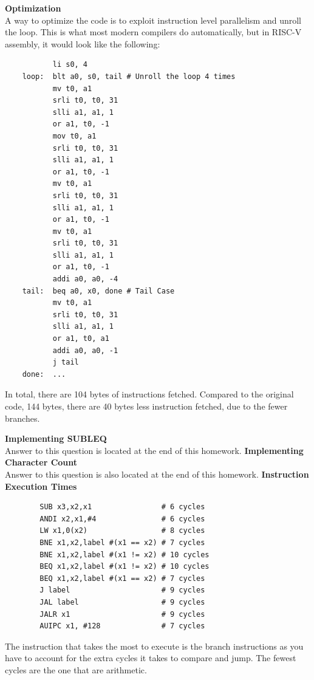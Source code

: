 \documentclass[11pt]{article}
\begin{document}
\begin{Parts}
	\Part \textbf{Optimization} \\
	A way to optimize the code is to exploit instruction level parallelism and unroll the loop. This is what most modern compilers do automatically, but in RISC-V assembly, it would look like the following: \\
	\begin{lstlisting}
           li s0, 4
    loop:  blt a0, s0, tail # Unroll the loop 4 times
    	   mv t0, a1
	       srli t0, t0, 31
	       slli a1, a1, 1
	       or a1, t0, -1
	       mov t0, a1
	       srli t0, t0, 31
	       slli a1, a1, 1
	       or a1, t0, -1
	       mv t0, a1
	       srli t0, t0, 31
	       slli a1, a1, 1
	       or a1, t0, -1
	       mv t0, a1
	       srli t0, t0, 31
	       slli a1, a1, 1
	       or a1, t0, -1
	       addi a0, a0, -4
    tail:  beq a0, x0, done # Tail Case
           mv t0, a1 
           srli t0, t0, 31
           slli a1, a1, 1
           or a1, t0, a1
           addi a0, a0, -1
           j tail
    done:  ...
    \end{lstlisting}
	In total, there are 104 bytes of instructions fetched. Compared to the original code, 144 bytes, there are 40 bytes less instruction fetched, due to the fewer branches.
\end{Parts}
\newpage

\begin{Parts}
	\Part \textbf{Implementing SUBLEQ} \\
	Answer to this question is located at the end of this homework.
	\Part \textbf{Implementing Character Count} \\
	Answer to this question is also located at the end of this homework.
	\Part \textbf{Instruction Execution Times} \\
	\begin{lstlisting}
    	SUB x3,x2,x1                # 6 cycles
		ANDI x2,x1,#4               # 6 cycles
		LW x1,0(x2)                 # 8 cycles
		BNE x1,x2,label #(x1 == x2) # 7 cycles
		BNE x1,x2,label #(x1 != x2) # 10 cycles
		BEQ x1,x2,label #(x1 != x2) # 10 cycles
		BEQ x1,x2,label #(x1 == x2) # 7 cycles
		J label                     # 9 cycles
		JAL label                   # 9 cycles
		JALR x1                     # 9 cycles
		AUIPC x1, #128              # 7 cycles
    \end{lstlisting}
\end{Parts}
The instruction that takes the most to execute is the branch instructions as you have to account for the extra cycles it takes to compare and jump. The fewest cycles are the one that are arithmetic.
\newpage
\end{document}
